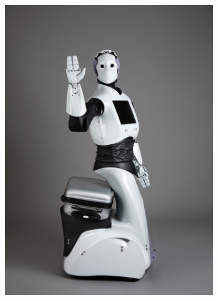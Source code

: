 \begin{figure}
   \centering
   \begin{subfigure}[b]{0.4\linewidth}
       \includegraphics{figures/reemh2}
       \caption{}
       \label{fig:reemh2}
    \end{subfigure}
    \begin{subfigure}[b]{0.4\linewidth}

\end{subfigure}
\end{figure}
